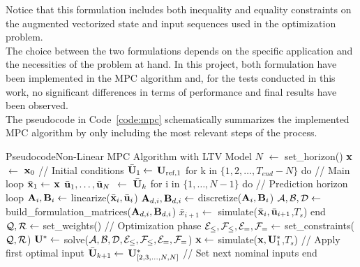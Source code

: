 \documentclass[../main.tex]{subfiles}
\begin{document}
Notice that this formulation includes both inequality and equality constraints
on the augmented vectorized state and input sequences used in the optimization
problem.\\
The choice between the two formulations depends on the specific application and
the necessities of the problem at hand. In this project, both formulation have
been implemented in the MPC algorithm and, for the tests conducted in this work,
no significant differences in terms of performance and final results have been
observed.\\
The pseudocode in Code~\ref{code:mpc} schematically summarizes the
implemented MPC algorithm by only including the most relevant steps of the
process.

\begin{codeblock}
\begin{code}{Pseudocode}{Non-Linear MPC Algorithm with LTV Model}
$N$ $\leftarrow$ set_horizon()
$\mathbf{x}$ $\leftarrow$ $\mathbf{x}_0$													 // Initial conditions
$\bar{\mathbf{U}}_{1} \leftarrow$ $\mathbf{U}_{\text{ref}, 1}$
for k in $\{1, 2, \ldots, T_{end} - N\}$ do			// Main loop
	$\bar{\mathbf{x}}_1 \leftarrow$ $\mathbf{x}$
	$\bar{\mathbf{u}}_1, \ldots, \bar{\mathbf{u}}_N$ $\leftarrow$ $\bar{\mathbf{U}}_{k}$
	for i in $\{1, \dots, N-1\}$ do				// Prediction horizon loop
		$\mathbf{A}_{i}, \mathbf{B}_{i} \leftarrow$ linearize($\bar{\mathbf{x}}_{i}, \bar{\mathbf{u}}_{i}$)
		$\mathbf{A}_{d,i}, \mathbf{B}_{d,i} \leftarrow$ discretize($\mathbf{A}_{i}, \mathbf{B}_{i}$)
		$\mathcal{A}, \mathcal{B}, \mathcal{D} \leftarrow$ build_formulation_matrices($\mathbf{A}_{d,i}, \mathbf{B}_{d,i}$)
		$\bar{x}_{i+1} \leftarrow$ simulate($\bar{\mathbf{x}}_{i},
		\bar{\mathbf{u}}_{i+1}$,$T_s$)
	end
	$\mathcal{Q}, \mathcal{R} \leftarrow$ set_weights()						// Optimization phase
	$\mathcal{E}_{\leq}, \mathcal{F}_{\leq}, \mathcal{E}_{=}, \mathcal{F}_{=} \leftarrow$
	set_constraints($\mathcal{Q}, \mathcal{R}$)
	$\mathbf{U}^* \leftarrow$ solve($\mathcal{A}, \mathcal{B}, \mathcal{D}, \mathcal{E}_{\leq}, \mathcal{F}_{\leq}, \mathcal{E}_{=}, \mathcal{F}_{=}$)	
	$\mathbf{x} \leftarrow$ simulate($\mathbf{x}, \mathbf{U}^*_1$,$T_s$)					 // Apply first optimal input
	$\bar{\mathbf{U}}_{k+1} \leftarrow$ $\mathbf{U}^*_{[2, 3, \ldots, N, N]}$								// Set next nominal inputs
end
\end{code}
\caption{Main steps of the implemented MPC algorithm. Notice that the algorithm
	runs up to $T_{end} - N$ since the prediction horizon cannot be applied to
times beyond this limit.}
\label{code:mpc}
\end{codeblock}
\end{document}
